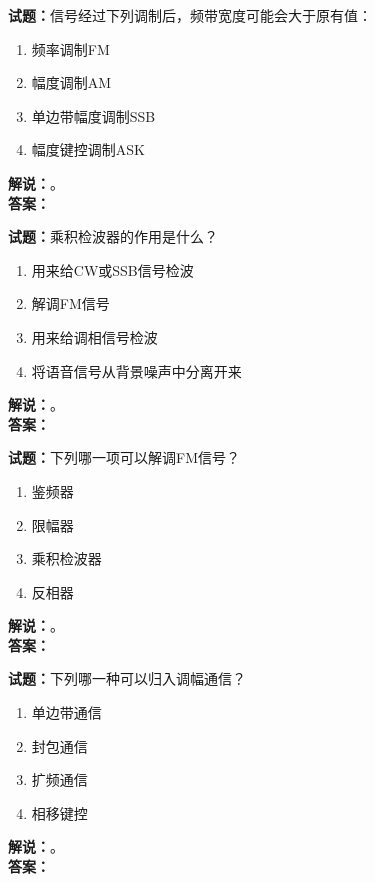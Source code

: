 \documentclass{ctexbook}
\begin{document}
\vspace{\baselineskip}

\noindent\textbf{试题：}信号经过下列调制后，频带宽度可能会大于原有值：
\begin{enumerate}[leftmargin=3em]
  \item 频率调制FM
  \item 幅度调制AM
  \item 单边带幅度调制SSB
  \item 幅度键控调制ASK
\end{enumerate}
\noindent\textbf{解说：}\textbf{}。\\\noindent\textbf{答案：}

\vspace{\baselineskip}

\noindent\textbf{试题：}乘积检波器的作用是什么？
\begin{enumerate}[leftmargin=3em]
  \item 用来给CW或SSB信号检波
  \item 解调FM信号
  \item 用来给调相信号检波
  \item 将语音信号从背景噪声中分离开来
\end{enumerate}
\noindent\textbf{解说：}\textbf{}。\\\noindent\textbf{答案：}

\vspace{\baselineskip}

\noindent\textbf{试题：}下列哪一项可以解调FM信号？
\begin{enumerate}[leftmargin=3em]
  \item 鉴频器
  \item 限幅器
  \item 乘积检波器
  \item 反相器
\end{enumerate}
\noindent\textbf{解说：}\textbf{}。\\\noindent\textbf{答案：}

\vspace{\baselineskip}

\noindent\textbf{试题：}下列哪一种可以归入调幅通信？
\begin{enumerate}[leftmargin=3em]
  \item 单边带通信
  \item 封包通信
  \item 扩频通信
  \item 相移键控
\end{enumerate}
\noindent\textbf{解说：}\textbf{}。\\\noindent\textbf{答案：}
\end{document}
